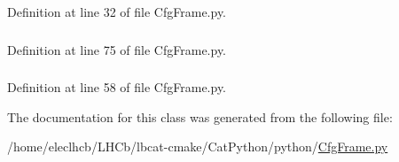 Definition at line 32 of file CfgFrame.py.\hypertarget{classCfgFrame_1_1CfgFrame_a8714ef9a155def75a58efc0a4e7d9db1}{
\subsubsection[{toolBar}]{}}
\label{classCfgFrame_1_1CfgFrame_a8714ef9a155def75a58efc0a4e7d9db1}


Definition at line 75 of file CfgFrame.py.\hypertarget{classCfgFrame_1_1CfgFrame_af212f85b15458aa623810483fb62219d}{
\subsubsection[{wrap}]{}}
\label{classCfgFrame_1_1CfgFrame_af212f85b15458aa623810483fb62219d}


Definition at line 58 of file CfgFrame.py.

The documentation for this class was generated from the following file:\begin{DoxyCompactItemize}
\item 
/home/eleclhcb/LHCb/lbcat-\/cmake/CatPython/python/\hyperlink{CfgFrame_8py}{CfgFrame.py}\end{DoxyCompactItemize}
